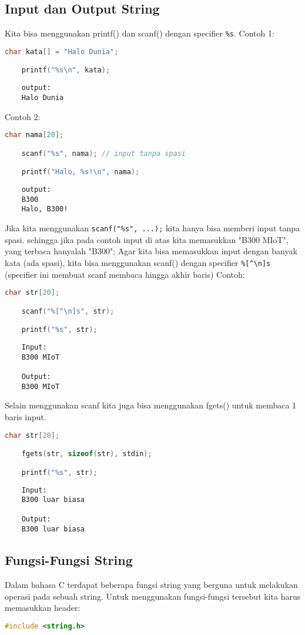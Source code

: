 \subsection{Input dan Output String}
Kita bisa menggunakan printf() dan scanf() dengan specifier \verb|%s|.
Contoh 1:
\begin{lstlisting}[language=c]
	char kata[] = "Halo Dunia";

	printf("%s\n", kata);
\end{lstlisting}
\begin{verbatim}
	output:
	Halo Dunia
\end{verbatim}
Contoh 2:
\begin{lstlisting}[language=c]
	char nama[20];

	scanf("%s", nama); // input tanpa spasi

	printf("Halo, %s!\n", nama);
\end{lstlisting}
\begin{verbatim}
	output:
	B300
	Halo, B300!
\end{verbatim}
Jika kita menggunakan \verb|scanf("%s", ...);| kita hanya bisa memberi input tanpa spasi.
sehingga jika pada contoh input di atas kita memasukkan "B300 MIoT", yang terbaca hanyalah "B300";
Agar kita bisa memasukkan input dengan banyak kata (ada spasi), 
kita bisa menggunakan scanf() dengan specifier \verb|%[^\n]s| (specifier ini membuat scanf membaca hingga akhir baris)
Contoh:
\begin{lstlisting}[language=c]
	char str[20];

	scanf("%[^\n]s", str);

	printf("%s", str);
\end{lstlisting}
\begin{verbatim}
	Input:
	B300 MIoT

	Output:
	B300 MIoT
\end{verbatim}
Selain menggunakan scanf kita juga bisa menggunakan fgets() untuk membaca 1 baris input.
\begin{lstlisting}[language=c]
	char str[20];

	fgets(str, sizeof(str), stdin);

	printf("%s", str);
\end{lstlisting}
\begin{verbatim}
	Input:
	B300 luar biasa

	Output:
	B300 luar biasa
\end{verbatim}

\subsection{Fungsi-Fungsi String}
Dalam bahasa C terdapat beberapa fungsi string yang berguna untuk melakukan operasi pada sebuah string.
Untuk menggunakan fungsi-fungsi tersebut kita harus memasukkan header:
\begin{lstlisting}[language=c]
	#include <string.h>
\end{lstlisting}

